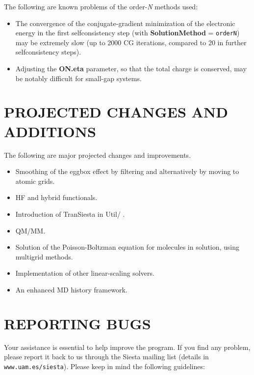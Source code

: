 \documentclass[11pt]{article}
\begin{document}
The following are known problems of the order-{\it N} methods used:

\begin{itemize}

\item
The convergence of the conjugate-gradient minimization of the
electronic energy in the first selfconsistency step (with
{\bf SolutionMethod} = {\tt orderN}) may be extremely slow 
(up to 2000 CG iterations, compared to 20 in further 
selfconsistency steps).

\item
Adjusting the {\bf ON.eta} parameter, so that the total charge
is conserved, may be notably difficult for small-gap systems.

\end{itemize}


\section{PROJECTED CHANGES AND ADDITIONS}

The following are major projected changes and improvements.

\begin{itemize}

\item
Smoothing of the eggbox effect by filtering and alternatively
by moving to atomic grids.

\item
HF and hybrid functionals.

\item
Introduction of {\sc TranSiesta} in Util/ .

\item
QM/MM.

\item
Solution of the Poisson-Boltzman equation for molecules in solution,
using multigrid methods.

\item
Implementation of other linear-scaling solvers.

\item 
An enhanced MD history framework.

\end{itemize}


\section{REPORTING BUGS}
Your assistance is essential to help improve the program. If you find
any problem, please report it back to us through the {\sc Siesta} mailing
list (details in {\tt www.uam.es/siesta}). Please keep in mind
the following guidelines:
\end{document}
